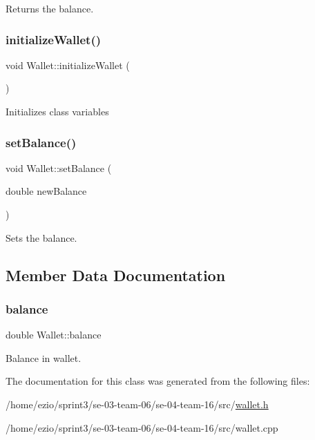 Returns the balance. \mbox{\label{classWallet_a78d2d2fcbaa3e026673692ccb66e4c58}} 
\subsubsection{\texorpdfstring{initialize\+Wallet()}{initializeWallet()}}
{\footnotesize\ttfamily void Wallet\+::initialize\+Wallet (\begin{DoxyParamCaption}{ }\end{DoxyParamCaption})}

Initializes class variables \mbox{\label{classWallet_a84887f86d53ddf090421365c8ac52661}} 
\subsubsection{\texorpdfstring{set\+Balance()}{setBalance()}}
{\footnotesize\ttfamily void Wallet\+::set\+Balance (\begin{DoxyParamCaption}\item[{double}]{new\+Balance }\end{DoxyParamCaption})}

Sets the balance. 

\subsection{Member Data Documentation}
\mbox{\label{classWallet_acb690105f6e130dac3c0dbd90e842d0a}} 
\subsubsection{\texorpdfstring{balance}{balance}}
{\footnotesize\ttfamily double Wallet\+::balance}

Balance in wallet. 

The documentation for this class was generated from the following files\+:\begin{DoxyCompactItemize}
\item 
/home/ezio/sprint3/se-\/03-\/team-\/06/se-\/04-\/team-\/16/src/\hyperlink{wallet_8h}{wallet.\+h}\item 
/home/ezio/sprint3/se-\/03-\/team-\/06/se-\/04-\/team-\/16/src/wallet.\+cpp\end{DoxyCompactItemize}
